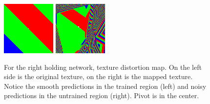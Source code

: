 \documentclass[12pt]{article}
\begin{document}
\begin{figure}[!htb]
\includegraphics[width=\linewidth]{figures/right/original.png}
\endminipage\hfill
{}
\includegraphics[width=\linewidth]{figures/right/mapped.png}
\endminipage\hfill
\caption{For the right holding network, texture distortion map. On the left side is the original texture, on the right is the mapped texture. Notice the smooth predictions in the trained region (left) and noisy predictions in the untrained region (right). Pivot is in the center.}
\label{fig:rt}
\end{figure}
\end{document}
